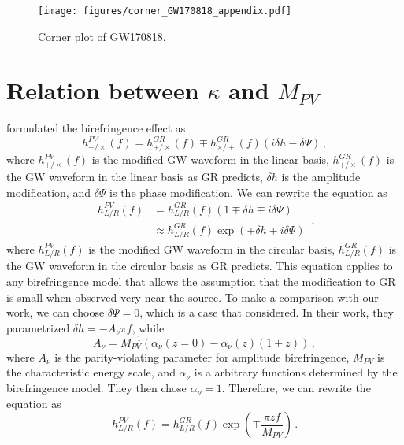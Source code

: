 \documentclass[aps,prd,twocolumn,superscriptaddress,preprintnumbers,floatfix,nofootinbib]{revtex4-2}
\begin{document}
\begin{figure*}[h]
    \texttt{[image: figures/corner\_GW170818\_appendix.pdf]}
    \caption{
        Corner plot of GW170818.
    }
    \label{fig:corner_GW170818_appendix}
\end{figure*}

\section{Relation between $\kappa$ and $M_{PV}$}
\label{sec:M_PV_derivation}

\citet{Wang_2021} formulated the birefringence effect as
\begin{equation}
    h_{+/\times}^{PV}(f) = h_{+/\times}^{GR}(f)\mp h_{\times/+}^{GR}(f)(i\delta h-\delta\Psi)\,,
\end{equation}
where $h_{+/\times}^{PV}(f)$ is the modified \ac{GW} waveform in the linear basis, $h_{+/\times}^{GR}(f)$ is the \ac{GW} waveform in the linear basis as \ac{GR} predicts, $\delta h$ is the amplitude modification, and $\delta\Psi$ is the phase modification.
We can rewrite the equation as
\begin{equation}
\begin{split}
    h_{L/R}^{PV}(f)&=h_{L/R}^{GR}(f)(1\mp\delta h\mp i\delta\Psi)\\
    &\approx h_{L/R}^{GR}(f)\exp\left(\mp\delta h\mp i\delta\Psi\right)
\end{split}
\,,
\end{equation}
where $h_{L/R}^{PV}(f)$ is the modified \ac{GW} waveform in the circular basis, $h_{L/R}^{GR}(f)$ is the \ac{GW} waveform in the circular basis as \ac{GR} predicts.
This equation applies to any birefringence model that allows the assumption that the modification to \ac{GR} is small when observed very near the source.
To make a comparison with our work, we can choose $\delta\Psi=0$, which is a case that \citet{Wang_2021} considered.
In their work, they parametrized $\delta h=-A_\nu\pi f$, while
\begin{equation}
    A_\nu=M_{PV}^{-1}(\alpha_\nu(z=0)-\alpha_\nu(z)(1+z))\,,
\end{equation}
where $A_\nu$ is the parity-violating parameter for amplitude birefringence, $M_{PV}$ is the characteristic energy scale, and $\alpha_\nu$ is a arbitrary functions determined by the birefringence model.
They then chose $\alpha_\nu=1$.
Therefore, we can rewrite the equation as
\begin{equation}
    h_{L/R}^{PV}(f)= h_{L/R}^{GR}(f)\exp\left(\mp\frac{\pi zf}{M_{PV}}\right)\,.
\end{equation}
\end{document}
